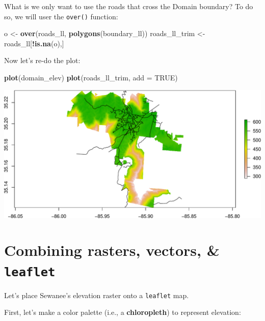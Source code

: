 \documentclass[]{book}
\newenvironment{Shaded}{\begin{snugshade}}{\end{snugshade}}
\newcommand{\DataTypeTok}[1]{\textcolor[rgb]{0.13,0.29,0.53}{#1}}
\newcommand{\KeywordTok}[1]{\textcolor[rgb]{0.13,0.29,0.53}{\textbf{#1}}}
\newcommand{\NormalTok}[1]{#1}
\newcommand{\OperatorTok}[1]{\textcolor[rgb]{0.81,0.36,0.00}{\textbf{#1}}}
\newcommand{\OtherTok}[1]{\textcolor[rgb]{0.56,0.35,0.01}{#1}}
\newcommand{\StringTok}[1]{\textcolor[rgb]{0.31,0.60,0.02}{#1}}
\begin{document}
What is we only want to use the roads that cross the Domain boundary? To do so, we will user the \texttt{over()} function:

\begin{Shaded}
\begin{Highlighting}[]
\NormalTok{o <-}\StringTok{ }\KeywordTok{over}\NormalTok{(roads_ll, }\KeywordTok{polygons}\NormalTok{(boundary_ll))}
\NormalTok{roads_ll_trim <-}\StringTok{ }\NormalTok{roads_ll[}\OperatorTok{!}\KeywordTok{is.na}\NormalTok{(o),]}
\end{Highlighting}
\end{Shaded}

Now let's re-do the plot:

\begin{Shaded}
\begin{Highlighting}[]
\KeywordTok{plot}\NormalTok{(domain_elev)}
\KeywordTok{plot}\NormalTok{(roads_ll_trim, }\DataTypeTok{add =} \OtherTok{TRUE}\NormalTok{)}
\end{Highlighting}
\end{Shaded}

\includegraphics{figures/unnamed-chunk-661-1.pdf}

\hypertarget{combining-rasters-vectors-leaflet}{%
\section*{\texorpdfstring{Combining rasters, vectors, \& \texttt{leaflet}}{Combining rasters, vectors, \& leaflet}}\label{combining-rasters-vectors-leaflet}}

Let's place Sewanee's elevation raster onto a \texttt{leaflet} map.

First, let's make a color palette (i.e., a \textbf{chloropleth}) to represent elevation:
\end{document}
